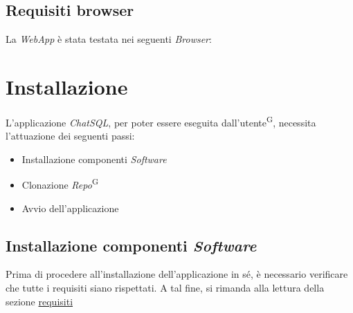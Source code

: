 \documentclass[5pt]{article}
\begin{document}
		\subsection{Requisiti browser}
			La \textit{WebApp} è stata testata nei seguenti \textit{Browser}:
			\begin{table}[H]
				\centering
				\caption{Requisiti Browser}
				\label{tab:browsers}
			\end{table}
	
	\newpage	
	\section{Installazione}
		L'applicazione \textit{ChatSQL}, per poter essere eseguita dall'utente\textsuperscript{G}, necessita l'attuazione dei seguenti passi:
		\begin{itemize}
			\item Installazione componenti \textit{Software}
			\item Clonazione \textit{Repo}\textsuperscript{G}
			\item Avvio dell'applicazione
		\end{itemize}

		\subsection{Installazione componenti \textit{Software}}
			Prima di procedere all'installazione dell'applicazione in sé, è necessario verificare che tutte i requisiti siano rispettati.
			A tal fine, si rimanda alla lettura della sezione \hyperref[sec:requisiti]{requisiti}
			
\end{document}
